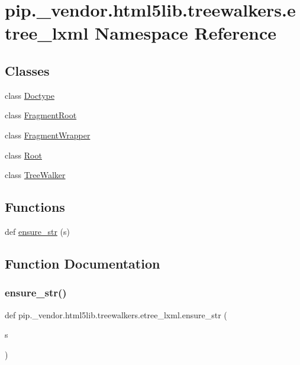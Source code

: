 \hypertarget{namespacepip_1_1__vendor_1_1html5lib_1_1treewalkers_1_1etree__lxml}{}\section{pip.\+\_\+vendor.\+html5lib.\+treewalkers.\+etree\+\_\+lxml Namespace Reference}
\label{namespacepip_1_1__vendor_1_1html5lib_1_1treewalkers_1_1etree__lxml}
\subsection*{Classes}
\begin{DoxyCompactItemize}
\item 
class \hyperlink{classpip_1_1__vendor_1_1html5lib_1_1treewalkers_1_1etree__lxml_1_1Doctype}{Doctype}
\item 
class \hyperlink{classpip_1_1__vendor_1_1html5lib_1_1treewalkers_1_1etree__lxml_1_1FragmentRoot}{Fragment\+Root}
\item 
class \hyperlink{classpip_1_1__vendor_1_1html5lib_1_1treewalkers_1_1etree__lxml_1_1FragmentWrapper}{Fragment\+Wrapper}
\item 
class \hyperlink{classpip_1_1__vendor_1_1html5lib_1_1treewalkers_1_1etree__lxml_1_1Root}{Root}
\item 
class \hyperlink{classpip_1_1__vendor_1_1html5lib_1_1treewalkers_1_1etree__lxml_1_1TreeWalker}{Tree\+Walker}
\end{DoxyCompactItemize}
\subsection*{Functions}
\begin{DoxyCompactItemize}
\item 
def \hyperlink{namespacepip_1_1__vendor_1_1html5lib_1_1treewalkers_1_1etree__lxml_a028cec52b33e2067b38382eb23c523b9}{ensure\+\_\+str} (s)
\end{DoxyCompactItemize}


\subsection{Function Documentation}
\mbox{\label{namespacepip_1_1__vendor_1_1html5lib_1_1treewalkers_1_1etree__lxml_a028cec52b33e2067b38382eb23c523b9}} 
\subsubsection{\texorpdfstring{ensure\+\_\+str()}{ensure\_str()}}
{\footnotesize\ttfamily def pip.\+\_\+vendor.\+html5lib.\+treewalkers.\+etree\+\_\+lxml.\+ensure\+\_\+str (\begin{DoxyParamCaption}\item[{}]{s }\end{DoxyParamCaption})}


